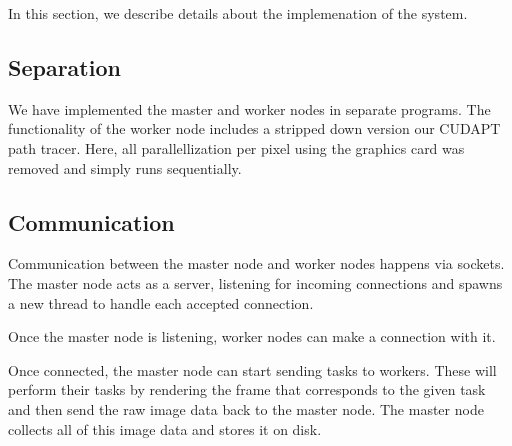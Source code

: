 In this section, we describe details about the implemenation of the system.

\subsection{Separation}
We have implemented the master and worker nodes in separate programs.
The functionality of the worker node includes a stripped down version our CUDAPT\cite{cudapt} path tracer.
Here, all parallellization per pixel using the graphics card was removed and simply runs sequentially.

\subsection{Communication}
Communication between the master node and worker nodes happens via sockets.
The master node acts as a server, listening for incoming connections and spawns a new thread to handle each accepted connection.

Once the master node is listening, worker nodes can make a connection with it.

Once connected, the master node can start sending tasks to workers.
These will perform their tasks by rendering the frame that corresponds to the given task and then send the raw image data back to the master node.
The master node collects all of this image data and stores it on disk.
